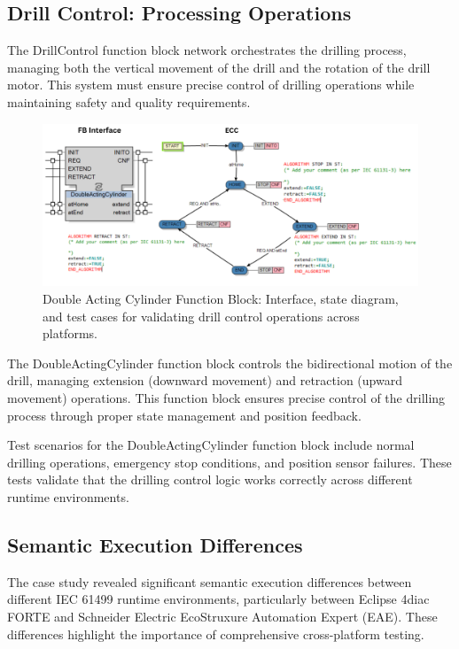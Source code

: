 \subsection{Drill Control: Processing Operations}

The DrillControl function block network orchestrates the drilling process, managing both the vertical movement of the drill and the rotation of the drill motor. This system must ensure precise control of drilling operations while maintaining safety and quality requirements.

\begin{figure}[!htbp]
    \centering
    \includegraphics[width=0.99\linewidth]{MX_Papers/Paper10/Figures/DoubleActingCylinderV2.png}
    \caption{Double Acting Cylinder Function Block: Interface, state diagram, and test cases for validating drill control operations across platforms.}
    \label{fig:double_acting_cylinder}
\end{figure}

The DoubleActingCylinder function block controls the bidirectional motion of the drill, managing extension (downward movement) and retraction (upward movement) operations. This function block ensures precise control of the drilling process through proper state management and position feedback.

Test scenarios for the DoubleActingCylinder function block include normal drilling operations, emergency stop conditions, and position sensor failures. These tests validate that the drilling control logic works correctly across different runtime environments.

\subsection{Semantic Execution Differences}

The case study revealed significant semantic execution differences between different IEC 61499 runtime environments, particularly between Eclipse 4diac FORTE and Schneider Electric EcoStruxure Automation Expert (EAE). These differences highlight the importance of comprehensive cross-platform testing.

